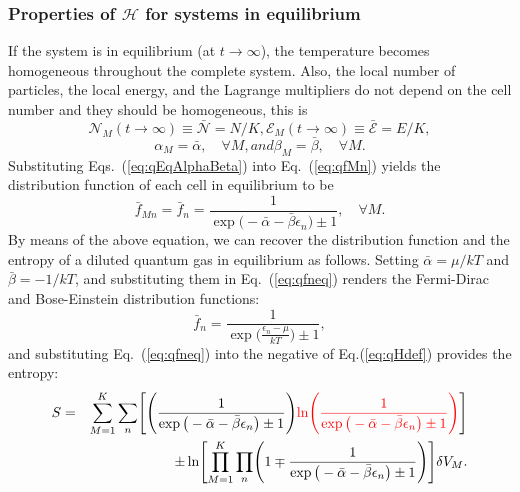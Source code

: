 \subsubsection{Properties of $\mathcal{H}$ for systems in equilibrium}
If the system is in equilibrium (at $t\to\infty$), the temperature becomes homogeneous throughout
the complete system. Also, the local number of particles, the local
energy, and the Lagrange multipliers do not depend on the cell number and they should be homogeneous,
this is 
%
\begin{subequations}\label{eq:qEqRestrictions}
\begin{equation}
   {\mathcal{N}}_M(t\to\infty)\equiv \bar{\mathcal{N}}=N/K,
\end{equation}
%
%
\begin{equation}
	{\mathcal{E}}_M(t\to\infty)\equiv \bar{\mathcal{E}}=E/K,
\end{equation}
\end{subequations}
%
%
\begin{subequations}\label{eq:qEqAlphaBeta}
\begin{equation}
	\alpha_M=\bar\alpha,\quad\forall M,
\end{equation}
%
and
\begin{equation}
	\beta_M=\bar\beta, \quad\forall M.
\end{equation}
\end{subequations}
%
Substituting Eqs.~(\ref{eq:qEqAlphaBeta}) into Eq.~(\ref{eq:qfMn}) yields the distribution
function of each cell in equilibrium to be
%
\begin{equation}\label{eq:qfneq}
    \bar f_{Mn}=\bar f_n =\frac{1}{\exp\big(-\bar\alpha-\bar\beta \epsilon_n\big)\pm 1},\quad\forall M.
\end{equation}
%
By means of the above equation, we can recover the distribution function and the entropy of a diluted quantum gas in equilibrium as follows. Setting $\bar\alpha=\mu/kT$ and $\bar\beta=-1/kT$,
and substituting them in Eq.~(\ref{eq:qfneq}) renders the Fermi-Dirac and Bose-Einstein
distribution functions:
%
\begin{equation}
    \bar{f}_{n}=\frac{1}{\exp\big(\frac{{\epsilon_n}-\mu}{kT}\big)\pm 1},
\end{equation}
%
and substituting Eq.~(\ref{eq:qfneq}) into the negative of Eq.(\ref{eq:qHdef}) provides the entropy:
%
\begin{eqnarray}\label{eq:varEntropyDef}
      S&=&\sum_{M=1}^{K}
        \sum_n  \left[
        		\left(\frac{1}{\exp\big(-\bar{\alpha}-\bar{\beta}\epsilon_{n}\big)\pm 1} \right)
           \commr{\ln \left(\frac{1}{\exp\big(-\bar{\alpha}-\bar{\beta}\epsilon_{n}\big)\pm 1} \right)}
         \right]\nonumber \\
      &&\quad\pm  \ln \left[\prod_{M=1}^{K} \prod_{n}
         \left(1 \mp \frac{1}{\exp\big(-\bar{\alpha}-\bar{\beta}\epsilon_{n}\big)\pm 1} \right)
         \right] \delta V_M.
\end{eqnarray}
